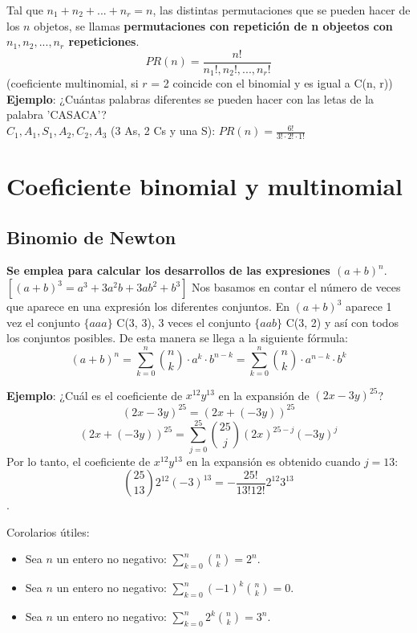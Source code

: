 \documentclass{article}
\begin{document}
Tal que $n_1 + n_2 + ... + n_r = n$, las distintas permutaciones que se pueden  hacer de los $n$ objetos, se llamas \textbf{permutaciones con repetición de n objeetos con $n_1, n_2, ..., n_r$ repeticiones}. 
$$PR(n) = \frac{n!}{n_1!, n_2!, ..., n_r!}$$
(coeficiente multinomial, si $r$ = 2 coincide con el binomial y es igual a C(n, r)) \\

\textbf{Ejemplo}: ¿Cuántas palabras diferentes se pueden hacer con las letas de la palabra 'CASACA'? \\

$C_1, A_1, S_1, A_2, C_2, A_3$ (3 As, 2 Cs y una S): $PR(n) = \frac{6!}{3! \cdot 2! \cdot 1!}$

\newpage

\section{Coeficiente binomial y multinomial}
\subsection{Binomio de Newton}
\textbf{Se emplea para calcular los desarrollos de las expresiones $(a+b)^n$}. \\
$[(a+b)^3 = a^3 + 3a^2b + 3ab^2 + b^3]$ Nos basamos en contar el número de veces que aparece en una expresión los diferentes conjuntos. En $(a+b)^3$ aparece 1 vez el conjunto $\{aaa\}$ C(3, 3), 3 veces el conjunto $\{aab\}$ C(3, 2) y así con todos los conjuntos posibles. De esta manera se llega a la siguiente fórmula:
$$(a+b)^n = \sum_{k=0}^{n} \binom{n}{k} \cdot a^k \cdot b^{n-k} = \sum_{k=0}^{n} \binom{n}{k} \cdot a^{n-k} \cdot b^{k} $$ 

\textbf{Ejemplo}: ¿Cuál es el coeficiente de $x^{12}y^{13}$ en la expansión de $(2x-3y)^{25}$?
$$(2x-3y)^{25} = (2x+(-3y))^{25}$$
$$(2x+(-3y))^{25} = \sum_{j=0}^{25} \binom{25}{j}(2x)^{25-j}(-3y)^j$$
Por lo tanto, el coeficiente de $x^{12}y^{13}$ en la expansión es obtenido cuando $j = 13$: 
$$\binom{25}{13}2^{12}(-3)^{13} = -\frac{25!}{13!12!}2^{12}3^{13}$$.

Corolarios útiles: 
\begin{itemize}
    \item Sea $n$ un entero no negativo: $\sum_{k=0}^n \binom{n}{k} = 2^n$.

    \item Sea $n$ un entero no negativo: $\sum_{k=0}^n (-1)^k \binom{n}{k} = 0$.

    \item Sea $n$ un entero no negativo: $\sum_{k=0}^n 2^k \binom{n}{k} = 3^n.$
\end{itemize}
\end{document}
